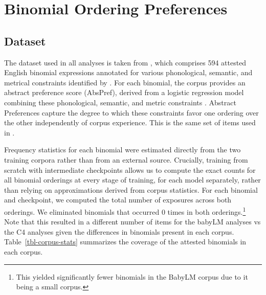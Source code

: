 \documentclass{article}
\begin{document}
\section{Binomial Ordering
Preferences}\label{binomial-ordering-preferences}

\subsection{Dataset}\label{dataset}

The dataset used in all analyses is taken from
\citet{morganModelingIdiosyncraticPreferences2015}, which comprises 594
attested English binomial expressions annotated for various
phonological, semantic, and metrical constraints identified by
\citet{benorChickenEggProbabilistic2006}. For each binomial, the corpus
provides an abstract preference score (AbsPref), derived from a logistic
regression model combining these phonological, semantic, and metric
constraints \citep{morgan2016abstractknowledgedirect}. Abstract
Preferences capture the degree to which these constraints favor one
ordering over the other independently of corpus experience. This is the
same set of items used in
\citet{houghton2025roleabstractrepresentations}.

Frequency statistics for each binomial were estimated directly from the
two training corpora rather than from an external source. Crucially,
training from scratch with intermediate checkpoints allows us to compute
the exact counts for all binomial orderings at every stage of training,
for each model separately, rather than relying on approximations derived
from corpus statistics. For each binomial and checkpoint, we computed
the total number of exposures across both orderings. We eliminated
binomials that occurred 0 times in both orderings.\footnote{This yielded
  significantly fewer binomials in the BabyLM corpus due to it being a
  small corpus.} Note that this resulted in a different number of items
for the babyLM analyses vs the C4 analyses given the differences in
binomials present in each corpus. Table~\ref{tbl-corpus-stats}
summarizes the coverage of the attested binomials in each corpus.
\end{document}
